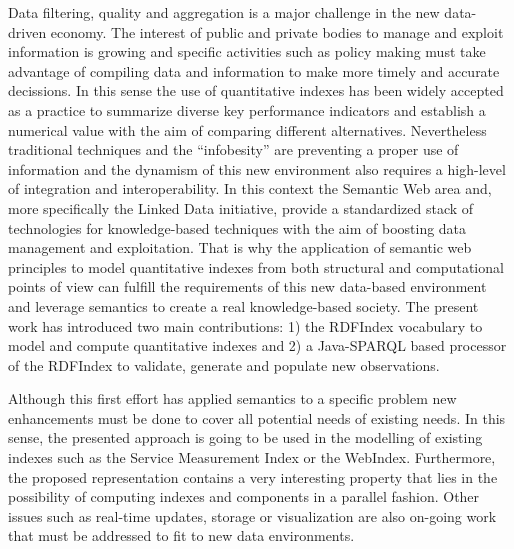 Data filtering, quality and aggregation is a major challenge in the 
new data-driven economy. The interest of public and private bodies 
to manage and exploit information is growing and specific activities 
such as policy making must take advantage of compiling data and information 
to make more timely and accurate decissions. In this sense the use 
of quantitative indexes has been widely accepted as a practice to 
summarize diverse key performance indicators and establish a numerical 
value with the aim of comparing different alternatives. Nevertheless traditional techniques 
and the ``infobesity'' are preventing a proper use of information and the dynamism 
of this new environment also requires a high-level of integration and interoperability. In this 
context the Semantic Web area and, more specifically the Linked Data initiative, 
provide a standardized stack of technologies for knowledge-based techniques with 
the aim of boosting data management and exploitation. That is why the application 
of semantic web principles to model quantitative indexes from both structural and 
computational points of view can fulfill the requirements of this new data-based 
environment and leverage semantics to create a real knowledge-based society. The 
present work has introduced two main contributions: 1) the RDFIndex vocabulary to model and compute quantitative indexes and 
2) a Java-SPARQL based processor of the RDFIndex to validate, generate and populate new observations.

Although this first effort has applied semantics to a specific problem new enhancements 
must be done to cover all potential needs of existing needs. In this sense, the presented 
approach is going to be used in the modelling of existing indexes such as the Service Measurement Index or 
the WebIndex. Furthermore, the proposed representation contains a very interesting property 
that lies in the possibility of computing indexes and components in a parallel fashion. 
Other issues such as real-time updates, storage or visualization are also on-going work 
that must be addressed to fit to new data environments.





